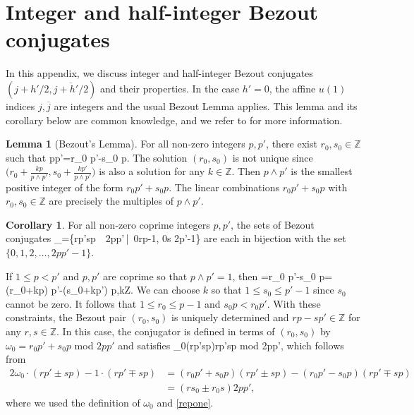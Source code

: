\documentclass[11pt]{article}
\numberwithin{equation}{section}
\theoremstyle{definition}
\newtheorem{Lemma}[Proposition]{Lemma}
\newtheorem{Corollary}[Proposition]{Corollary}
\numberwithin{equation}{section}
\def\jbar{\overline j}
\renewcommand{\le}{\leqslant}
\begin{document}
\section{Integer and half-integer Bezout conjugates}\label{app:half.integer.Bezout}

In this appendix, we discuss integer and half-integer Bezout conjugates $(j+h'/2,\overline{j+h'/2})$ and their properties.
In the case $h'=0$, the affine $u(1)$ indices $j,\jbar$ are integers and the usual Bezout Lemma applies. This lemma and its corollary below are common knowledge, and we refer to \cite{FMS,WikiBezout} for more information.
\begin{Lemma}[Bezout's Lemma]
For all non-zero integers $p, p'$, there exist $r_0, s_0\in\mathbb Z$ such that
\be
p\wedge p'=r_0 p'-s_0 p.
\ee
The solution $(r_0,s_0)$ is not unique since $\big(r_0+\tfrac{kp}{p\wedge p'},s_0+\tfrac{kp'}{p\wedge p'}\big)$ is also a solution for any $k\in\mathbb Z$. Then $p\wedge p'$ is the smallest positive integer of the form $r_0 p'+s_0 p$. The linear combinations $r_0 p'+s_0 p$ with $r_0,s_0 \in \mathbb Z$
are precisely the multiples of $p\wedge p'$. 
\end{Lemma}

\begin{Corollary}
\label{cor:Bezout.sets}
For all non-zero coprime integers $p,p'$, the sets of Bezout conjugates 
\be
{}_{\pm}=\{rp'\pm sp\ \ 2pp'\,\big|\, 0\le r\le p-1, 0\le s \le 2p'-1\}\label{Bconjugates}
\ee
are each in bijection with the set $\{0,1,2,\ldots,2pp'-1\}$. 
\end{Corollary}

If $1\le p<p'$ and $p,p'$ are coprime so that $p\wedge p'=1$, then 
=r_0 p'-s_0 p=(r_0+kp) p'-(s_0+kp') p,\qquad k\in\mathbb Z.
\label{repone}
\ee
We can choose $k$ so that $1\le s_0\le p'-1$ since $s_0$ cannot be zero. It follows that $1\le r_0\le p-1$ and $s_0 p<r_0 p'$. With these constraints, the Bezout pair $(r_0,s_0)$ is uniquely determined 
and $r p-s p'\in\mathbb Z$ for any $r,s\in\mathbb Z$. In this case, the conjugator is defined in terms of $(r_0,s_0)$ by $\omega_0=r_0p'+s_0p$ mod $2pp'$ and satisfies 
\be
\omega_0(rp'\pm sp)\equiv rp'\mp sp \textrm{ mod } 2pp',
\ee
which follows from
\begin{alignat}{2}
\omega_0\cdot(rp'\pm sp)-1\cdot(rp'\mp sp)
&=(r_0p'+s_0p)(rp'\pm sp)-(r_0p'-s_0p)(rp'\mp sp)
\nonumber\\[0.1cm]  
&=(r s_0\pm r_0 s)2pp',
\end{alignat}    
where we used the definition of $\omega_0$ and
\eqref{repone}.
\end{document}
